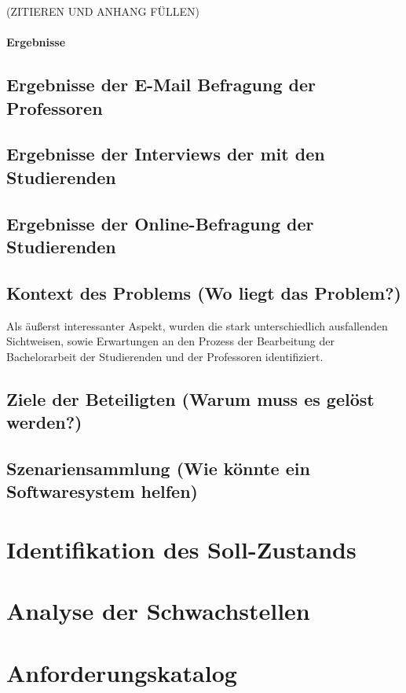 \documentclass{scrreprt}
\begin{document}
(ZITIEREN UND ANHANG FÜLLEN)\\\\
\textbf{Ergebnisse}








\subsection{Ergebnisse der E-Mail Befragung der Professoren}
\subsection{Ergebnisse der Interviews der mit den Studierenden}
\subsection{Ergebnisse der Online-Befragung der Studierenden}

\subsection{Kontext des Problems (Wo liegt das Problem?)}
Als äußerst interessanter Aspekt, wurden die stark unterschiedlich ausfallenden Sichtweisen, sowie Erwartungen an den Prozess der Bearbeitung der Bachelorarbeit der Studierenden und der Professoren identifiziert.

\subsection{Ziele der Beteiligten (Warum muss es gelöst werden?)}

\subsection{Szenariensammlung (Wie könnte ein Softwaresystem helfen)}

\section{Identifikation des Soll-Zustands}

\section{Analyse der Schwachstellen}

\section{Anforderungskatalog}
\end{document}
